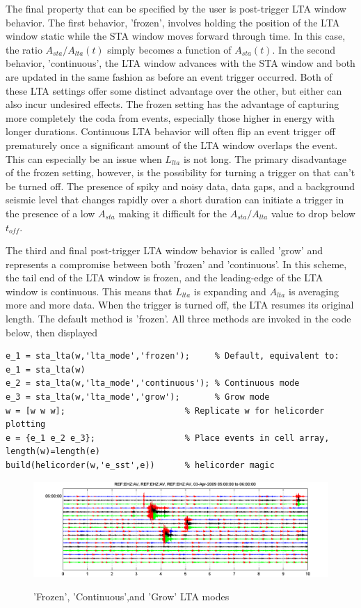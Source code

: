 \documentclass[11pt]{article}
\begin{document}
The final property that can be specified by the user is post-trigger LTA window behavior. The first behavior, 'frozen', involves holding the position of the LTA window static while the STA window moves forward through time. In this case, the ratio $A_{sta}/A_{lta}(t)$ simply becomes a function of $A_{sta}(t)$. In the second behavior, 'continuous', the LTA window advances with the STA window and both are updated in the same fashion as before an event trigger occurred. Both of these LTA settings offer some distinct advantage over the other, but either can also incur undesired effects. The frozen setting has the advantage of capturing more completely the coda from events, especially those higher in energy with longer durations. Continuous LTA behavior will often flip an event trigger off prematurely once a significant amount of the LTA window overlaps the event. This can especially be an issue when $L_{lta}$ is not long. The primary disadvantage of the frozen setting, however, is the possibility for turning a trigger on that can't be turned off. The presence of spiky and noisy data, data gaps, and a background seismic level that changes rapidly over a short duration can initiate a trigger in the presence of a low $A_{sta}$ making it difficult for the $A_{sta}/A_{lta}$ value to drop below $t_{off}$.

The third and final post-trigger LTA window behavior is called 'grow' and represents a compromise between both 'frozen' and 'continuous'. In this scheme, the tail end of the LTA window is frozen, and the leading-edge of the LTA window is continuous. This means that $L_{lta}$ is expanding and $A_{lta}$ is averaging more and more data. When the trigger is turned off, the LTA resumes its original length. The default method is 'frozen'. All three methods are invoked in the code below, then displayed 

\begin{lstlisting}
e_1 = sta_lta(w,'lta_mode','frozen');     % Default, equivalent to: e_1 = sta_lta(w)
e_2 = sta_lta(w,'lta_mode','continuous'); % Continuous mode
e_3 = sta_lta(w,'lta_mode','grow');       % Grow mode
w = [w w w];                        % Replicate w for helicorder plotting
e = {e_1 e_2 e_3};                  % Place events in cell array, length(w)=length(e)
build(helicorder(w,'e_sst',e))      % helicorder magic
\end{lstlisting}

\begin{figure}[ht] 
\centerline{\scalebox{.8} {\includegraphics{hel_lta_modes.png}}} 
\caption{'Frozen', 'Continuous',and 'Grow' LTA modes} 
\label{hel_lta_modes}
\end{figure}
\end{document}
